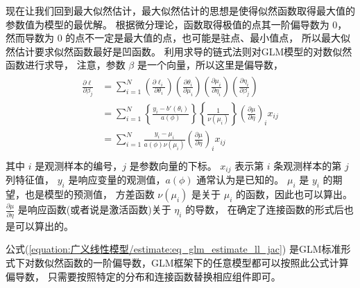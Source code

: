 \documentclass[letterpaper,10pt,english]{sphinxmanual}
\begin{document}
现在让我们回到最大似然估计，最大似然估计的思想是使得似然函数取得最大值的参数值为模型的最优解。
根据微分理论，函数取得极值的点其一阶偏导数为 \(0\)，
然而导数为 \(0\) 的点不一定是最大值的点，也可能是驻点、最小值点，
所以最大似然估计要求似然函数最好是凹函数。
利用求导的链式法则对GLM模型的对数似然函数进行求导，
注意，参数 \(\beta\) 是一个向量，所以这里是偏导数，
\begin{align}\label{equation:广义线性模型/estimate:eq_glm_estimate_ll_jac}\!\begin{aligned}
\frac{ \partial \ell}{ \partial \beta_j} &= \sum_{i=1}^N \left ( \frac{\partial \ell_i}{\partial \theta_i} \right )
\left ( \frac{\partial \theta_i}{\partial \mu_i} \right )
\left ( \frac{\partial \mu_i}{\partial \eta_i} \right )
\left ( \frac{\partial \eta_i}{\partial \beta_j} \right )\\
&= \sum_{i=1}^N \left \{ \frac{y_i-b'(\theta_i)}{a(\phi)}   \right \}
\left \{ \frac{1}{\nu(\mu_i)} \right \} \left ( \frac{\partial \mu}{\partial \eta} \right )_i x_{ij}\\
&= \sum_{i=1}^N \frac{y_i-\mu_i}{a(\phi) \nu(\mu_i) } \left ( \frac{\partial \mu}{\partial \eta} \right )_i x_{ij}\\
\end{aligned}\end{align}
其中 \(i\) 是观测样本的编号，\(j\) 是参数向量的下标。
\(x_{ij}\) 表示第 \(i\) 条观测样本的第 \(j\) 列特征值，
\(y_i\) 是响应变量的观测值，\(a(\phi)\) 通常认为是已知的。
\(\mu_i\) 是 \(y_i\) 的期望，也是模型的预测值，
方差函数 \(\nu(\mu_i)\) 是关于 \(\mu_i\) 的函数，因此也可以算出。
\(\frac{\partial \mu}{\partial \eta}\) 是响应函数(或者说是激活函数)关于 \(\eta_i\) 的导数，
在确定了连接函数的形式后也是可以算出的。

公式(\ref{equation:广义线性模型/estimate:eq_glm_estimate_ll_jac}) 是GLM标准形式下对数似然函数的一阶偏导数，GLM框架下的任意模型都可以按照此公式计算偏导数，
只需要按照特定的分布和连接函数替换相应组件即可。
\end{document}
